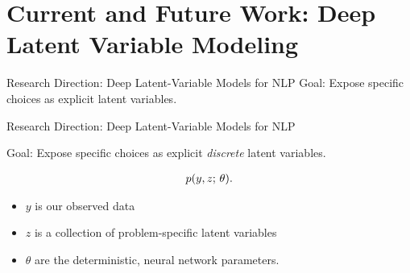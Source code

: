
\section{Current and Future Work: Deep Latent Variable Modeling}

\begin{frame}{Research Direction: Deep Latent-Variable Models for NLP }
  Goal: Expose specific choices as explicit latent variables.   
   \begin{center}
  \end{center}
\end{frame}

\begin{frame}{Research Direction: 
      Deep Latent-Variable Models for NLP }

  Goal: Expose specific choices as explicit \textit{discrete} latent variables.


\begin{align*}
p(y, z ; \, \theta).
\end{align*}

\pause
\begin{itemize}
    \item $y$ is our observed data
    \item $z$ is a collection of problem-specific latent variables
    \item $\theta$ are the deterministic, neural network parameters.
\end{itemize}



\end{frame}

